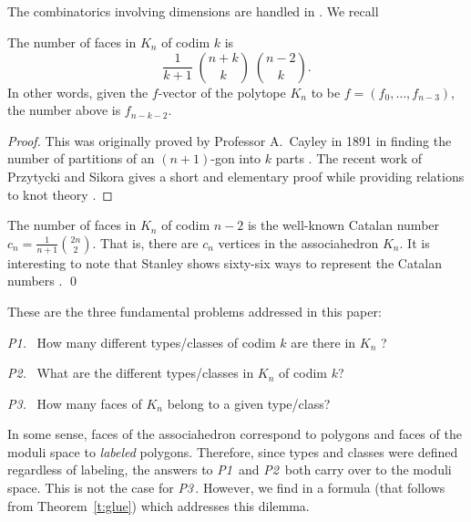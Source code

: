 \documentclass[10pt]{amsart}
\begin{document}

\subsection{}
The combinatorics involving dimensions are handled in \cite{dev}.  We recall

\begin{lem}
The number of faces in $K_n$ of codim $k$ is $$\frac{1}{k+1} \; \binom{n+k}{k} \; \binom{n-2}{k}.$$ 
In other words, given the $f$-vector of the polytope $K_n$ to be $f=(f_0, \ldots, f_{n-3})$, the number above is $f_{n-k-2}$.
\label{l:cayley}
\end{lem}

\begin{proof}
This was originally proved by Professor A.\ Cayley in 1891 in finding the number of partitions of an $(n+1)$-gon into $k$ parts  \cite{cay}. The recent work of Przytycki and Sikora gives a short and elementary proof while providing relations to knot theory \cite{ps}. 
\end{proof}

\begin{rem}
The number of faces in $K_n$ of codim $n-2$ is the well-known Catalan number $c_n = \frac{1}{n+1} \binom{2n}{2}$.  That is, there are $c_n$ vertices in the associahedron $K_n$.  It is interesting to note that Stanley shows sixty-six ways to represent the Catalan numbers \cite[Exercise 6.19]{s2}.
\qed
\end{rem}

\noindent These are the three fundamental problems addressed in this paper:
\vspace{.1in}

{\em P1.} \   How many different types/classes  of codim $k$ are there in $K_n$ ?
\vspace{.03in}

{\em P2.} \   What are the different types/classes in $K_n$ of codim $k$? 
\vspace{.03in}

{\em P3.} \  How many faces of $K_n$ belong to a given type/class?
\vspace{.1in}

In some sense, faces of the associahedron correspond to polygons and faces of the moduli space to {\em labeled} polygons.  Therefore, since types and classes were defined regardless of labeling, the answers to {\em P1}\, and {\em P2}\, both carry over to the moduli space. This is not the case for {\em P3}\,. However, we find in \cite{dev} a formula (that follows from Theorem~\ref{t:glue}) which addresses this dilemma.
\end{document}
